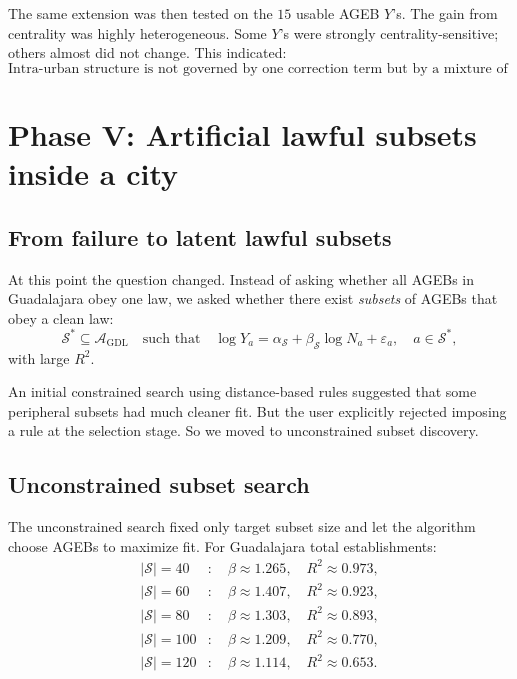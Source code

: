 \documentclass[11pt]{article}
\begin{document}
The same extension was then tested on the \(15\) usable AGEB \(Y\)'s. The gain from centrality was highly heterogeneous. Some \(Y\)'s were strongly centrality-sensitive; others almost did not change. This indicated:
\begin{equation}
\text{Intra-urban structure is not governed by one correction term but by a mixture of mechanisms.}
\end{equation}

\section{Phase V: Artificial lawful subsets inside a city}

\subsection{From failure to latent lawful subsets}

At this point the question changed. Instead of asking whether all AGEBs in Guadalajara obey one law, we asked whether there exist \emph{subsets} of AGEBs that obey a clean law:
\begin{equation}
\mathcal{S}^\ast \subseteq \mathcal{A}_{\mathrm{GDL}}
\quad\text{such that}\quad
\log Y_a = \alpha_{\mathcal{S}} + \beta_{\mathcal{S}} \log N_a + \varepsilon_a,
\quad
a \in \mathcal{S}^\ast,
\end{equation}
with large \(R^2\).

An initial constrained search using distance-based rules suggested that some peripheral subsets had much cleaner fit. But the user explicitly rejected imposing a rule at the selection stage. So we moved to unconstrained subset discovery.

\subsection{Unconstrained subset search}

The unconstrained search fixed only target subset size and let the algorithm choose AGEBs to maximize fit. For Guadalajara total establishments:
\begin{align}
|\mathcal{S}|=40 &: \quad \beta \approx 1.265,\quad R^2 \approx 0.973,\\
|\mathcal{S}|=60 &: \quad \beta \approx 1.407,\quad R^2 \approx 0.923,\\
|\mathcal{S}|=80 &: \quad \beta \approx 1.303,\quad R^2 \approx 0.893,\\
|\mathcal{S}|=100 &: \quad \beta \approx 1.209,\quad R^2 \approx 0.770,\\
|\mathcal{S}|=120 &: \quad \beta \approx 1.114,\quad R^2 \approx 0.653.
\end{align}
\end{document}
